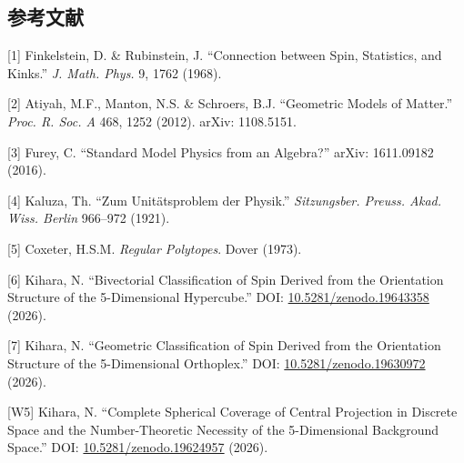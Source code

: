 \documentclass[
  a4paper,11pt]{ltjsarticle}
\theoremstyle{definition}
\theoremstyle{remark}
\begin{document}
\subsection{参考文献}\label{ux53c2ux8003ux6587ux732e}

{[}1{]} Finkelstein, D. \& Rubinstein, J. ``Connection between Spin,
Statistics, and Kinks.'' \emph{J. Math. Phys.} 9, 1762 (1968).

{[}2{]} Atiyah, M.F., Manton, N.S. \& Schroers, B.J. ``Geometric Models
of Matter.'' \emph{Proc. R. Soc. A} 468, 1252 (2012). arXiv: 1108.5151.

{[}3{]} Furey, C. ``Standard Model Physics from an Algebra?'' arXiv:
1611.09182 (2016).

{[}4{]} Kaluza, Th. ``Zum Unitätsproblem der Physik.''
\emph{Sitzungsber. Preuss. Akad. Wiss. Berlin} 966--972 (1921).

{[}5{]} Coxeter, H.S.M. \emph{Regular Polytopes}. Dover (1973).

{[}6{]} Kihara, N. ``Bivectorial Classification of Spin Derived from the
Orientation Structure of the 5-Dimensional Hypercube.'' DOI:
\href{https://doi.org/10.5281/zenodo.19643358}{10.5281/zenodo.19643358}
(2026).

{[}7{]} Kihara, N. ``Geometric Classification of Spin Derived from the
Orientation Structure of the 5-Dimensional Orthoplex.'' DOI:
\href{https://doi.org/10.5281/zenodo.19630972}{10.5281/zenodo.19630972}
(2026).

{[}W5{]} Kihara, N. ``Complete Spherical Coverage of Central Projection
in Discrete Space and the Number-Theoretic Necessity of the
5-Dimensional Background Space.'' DOI:
\href{https://doi.org/10.5281/zenodo.19624957}{10.5281/zenodo.19624957}
(2026).
\end{document}
